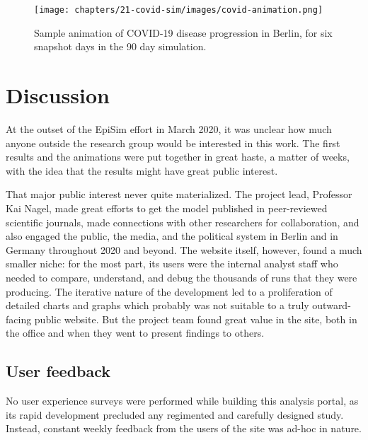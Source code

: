 \begin{figure}
  \centering
	\begin{minipage}{\textwidth}
    \centering
    \texttt{[image: chapters/21-covid-sim/images/covid-animation.png]}
  \caption{Sample animation of COVID-19 disease progression in Berlin, for six snapshot days in the 90 day simulation.}
  \label{fig:covid-animation}
	\end{minipage}
\end{figure}

\hypertarget{covid-discussion}{%
\section{Discussion}\label{covid-discussion}}

At the outset of the EpiSim effort in March 2020, it was unclear how much anyone outside the research group would be interested in this work. The first results and the animations were put together in great haste, a matter of weeks, with the idea that the results might have great public interest.

That major public interest never quite materialized. The project lead, Professor Kai Nagel, made great efforts to get the model published in peer-reviewed scientific journals, made connections with other researchers for collaboration, and also engaged the public, the media, and the political system in Berlin and in Germany throughout 2020 and beyond. The website itself, however, found a much smaller niche: for the most part, its users were the internal analyst staff who needed to compare, understand, and debug the thousands of runs that they were producing. The iterative nature of the development led to a proliferation of detailed charts and graphs which probably was not suitable to a truly outward-facing public website. But the project team found great value in the site, both in the office and when they went to present findings to others.

\hypertarget{covid-user-feedback}{%
\subsection{User feedback}\label{user-feedback}}

No user experience surveys were performed while building this analysis portal, as its rapid development precluded any regimented and carefully designed study. Instead, constant weekly feedback from the users of the site was ad-hoc in nature.

